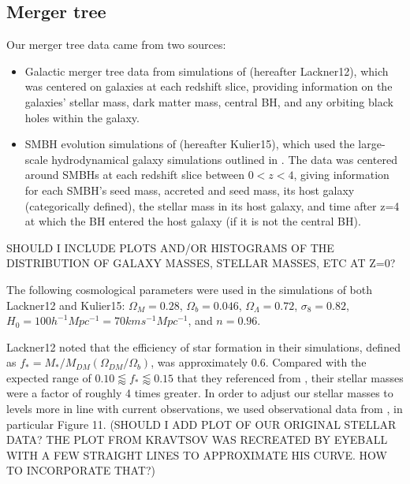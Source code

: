 \documentclass[english, apj]{emulateapj}
\begin{document}
\subsection{Merger tree}
Our merger tree data came from two sources:
\begin{itemize}
\item Galactic merger tree data from simulations of \citet{2012MNRAS.425..641L} (hereafter Lackner12), which was centered on galaxies at each redshift slice, providing information on the galaxies' stellar mass, dark matter mass, central BH, and any orbiting black holes within the galaxy.
\item SMBH evolution simulations of \citet{2015ApJ...799..178K} (hereafter Kulier15), which used the large-scale hydrodynamical galaxy simulations outlined in \citet{2011ApJ...741...99C, 2011ApJ...742L..33C, 2012ApJ...753...17C, 2012ApJ...748..121C, 2013ApJ...770..139C}.  The data was centered around SMBHs at each redshift slice between $0 < z < 4$, giving information for each SMBH's seed mass, accreted and seed mass, its host galaxy (categorically defined), the stellar mass in its host galaxy, and time after z=4 at which the BH entered the host galaxy (if it is not the central BH).
\end{itemize}

SHOULD I INCLUDE PLOTS AND/OR HISTOGRAMS OF THE DISTRIBUTION OF GALAXY MASSES, STELLAR MASSES, ETC AT Z=0?

The following cosmological parameters were used in the simulations of both Lackner12 and Kulier15:   $\Omega_M = 0.28$, $\Omega_b = 0.046$, $\Omega_\Lambda = 0.72$, $\sigma_8 = 0.82$, $H_0 = 100h^{-1}Mpc^{-1} = 70 km s^{-1} Mpc^{-1}$, and $n = 0.96$.

Lackner12 noted that the efficiency of star formation in their simulations, defined as $f_*=M_*/M_{DM}(\Omega_{DM}/\Omega_b)$, was approximately 0.6.  Compared with the expected range of $0.10 \lessapprox f_* \lessapprox 0.15$ that they referenced from \citet{2012ApJ...746...95L}, their stellar masses were a factor of roughly 4 times greater.  In order to adjust our stellar masses to levels more in line with current observations, we used observational data from \citet{2018AstL...44....8K}, in particular Figure 11. (SHOULD I ADD PLOT OF OUR ORIGINAL STELLAR DATA?  THE PLOT FROM KRAVTSOV WAS RECREATED BY EYEBALL WITH A FEW STRAIGHT LINES TO APPROXIMATE HIS CURVE.  HOW TO INCORPORATE THAT?)
\end{document}
